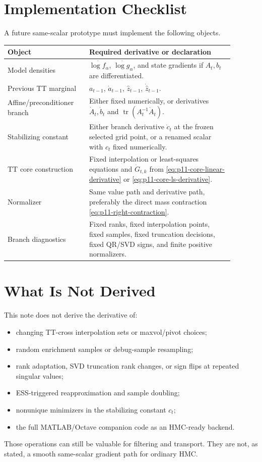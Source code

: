 \documentclass[11pt]{article}
\begin{document}
\section{Implementation Checklist}

A future same-scalar prototype must implement the following objects.

\begin{longtable}{@{}p{0.31\linewidth}p{0.58\linewidth}@{}}
\toprule
Object & Required derivative or declaration \\
\midrule
\endhead
Model densities & \(\dot{\log f_\alpha}\), \(\dot{\log g_\alpha}\), and state
gradients if \(A_t,b_t\) are differentiated. \\
Previous TT marginal & \(a_{t-1}\), \(\dot a_{t-1}\), \(\widehat z_{t-1}\),
\(\dot{\widehat z}_{t-1}\). \\
Affine/preconditioner branch & Either fixed numerically, or derivatives
\(\dot A_t,\dot b_t\) and \(\operatorname{tr}(A_t^{-1}\dot A_t)\). \\
Stabilizing constant & Either branch derivative \(\dot c_t\) at the frozen
selected grid point, or a renamed scalar with \(c_t\) fixed numerically. \\
TT core construction & Fixed interpolation or least-squares equations and
\(\dot G_{t,k}\) from \eqref{eq:p11-core-linear-derivative} or
\eqref{eq:p11-core-ls-derivative}. \\
Normalizer & Same value path and derivative path, preferably the direct mass
contraction \eqref{eq:p11-right-contraction}. \\
Branch diagnostics & Fixed ranks, fixed interpolation points, fixed samples,
fixed truncation decisions, fixed QR/SVD signs, and finite positive
normalizers. \\
\bottomrule
\end{longtable}

\section{What Is Not Derived}

This note does not derive the derivative of:
\begin{itemize}[leftmargin=*]
\item changing TT-cross interpolation sets or maxvol/pivot choices;
\item random enrichment samples or debug-sample resampling;
\item rank adaptation, SVD truncation rank changes, or sign flips at repeated
  singular values;
\item ESS-triggered reapproximation and sample doubling;
\item nonunique minimizers in the stabilizing constant \(c_t\);
\item the full MATLAB/Octave companion code as an HMC-ready backend.
\end{itemize}
Those operations can still be valuable for filtering and transport.  They are
not, as stated, a smooth same-scalar gradient path for ordinary HMC.
\end{document}
